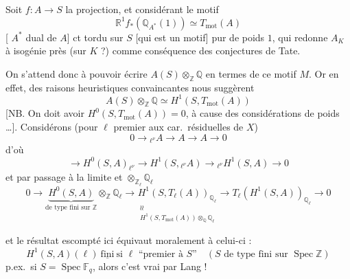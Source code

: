 \documentclass[11pt,a4paper]{article}
\begin{document}
Soit $f : A \to S$ la projection, et considérant le motif
\[
  \mathbb{R}^{1}f_{*}(\mathbb{Q}_{A^{*}}(1)) \simeq T_{\mathrm{mot}}(A)
\]
[ $A^{*}$  dual de $A$] ct tordu sur $S$
 [qui est un motif] pur de poids $1$, qui redonne $A_{K}$ à
isogénie près \struck{\ill{}} (sur $K$ ?) comme conséquence des conjectures
de Tate.

On s'attend donc à pouvoir écrire $A(S) \otimes_{\mathbb{Z}} \mathbb{Q}$ en
termes de ce motif $M$.
Or en effet, des raisons heuristiques convaincantes  nous suggèrent
\[
  A(S) \otimes_{\mathbb{Z}} \mathbb{Q} \simeq H^{1}(S, T_{\mathrm{mot}}(A))
\]
[NB. On doit avoir $H^{0}(S, T_{\mathrm{mot}}(A)) = 0$, à cause des
 considérations de poids …].
 Considérons
(pour $\ell$ premier aux car.\ résiduelles de $X$)
\[
  0 \longrightarrow {}_{\ell^{\nu}}A \longrightarrow A \longrightarrow A \longrightarrow 0
\]
d'où
\[
  \longrightarrow H^{0}(S, A)_{\ell^{\nu}} \longrightarrow H^{1}(S, {}_{\ell^{\nu}}A) \longrightarrow {}_{\ell^{\nu}}H^{1}(S, A) \longrightarrow 0
\]
et par passage à la limite et $\otimes_{\mathbb{Z}_{\ell}} \mathbb{Q}_{\ell}$
\[
  0 \longrightarrow \underbrace{H^{0}(S, A)}_{\text{de type fini sur } \mathbb{Z}} \otimes_{\mathbb{Z}} \mathbb{Q}_{\ell} \longrightarrow \underset{\substack{\wr\wr \\ H^{1}(S, T_{\mathrm{mot}}(A)) \otimes_{\mathbb{Q}} \mathbb{Q}_{\ell}}}{H^{1}(S, T_{\ell}(A))_{\mathbb{Q}_{\ell}}} \longrightarrow T_{\ell}(H^{1}(S, A))_{\mathbb{Q}_{\ell}} \longrightarrow 0
\]

et le résultat escompté ici équivaut moralement à celui-ci :
\[
  \boxed{\; H^{1}(S, A)(\ell) \ \underline{\text{fini}} \ \text{si } \ell \text{ “premier à } S \text{”} \quad (S \text{ de type fini sur } \operatorname{Spec} \mathbb{Z}) \;}
\]
p.ex.\ si $S = \operatorname{Spec} \mathbb{F}_{q}$, alors c'est vrai par Lang !
\end{document}
